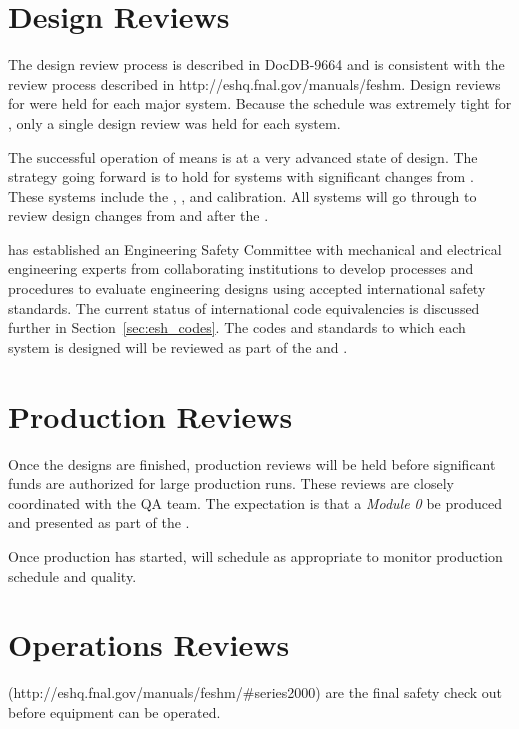 \section{Design Reviews}

The  design review process is described in DocDB-9664 and
is consistent with the \fnal review process described in
http://eshq.fnal.gov/manuals/feshm. Design reviews for
 were held for each major system. Because the
schedule was extremely tight for , only a single
design review was held for each system.

The successful operation of  means  is at
a very advanced state of design. The strategy going forward is to
hold  for systems with significant changes from
. These systems include the , ,
 and calibration. All systems will go through  to review
design changes from  and  after the
.

 has established an Engineering Safety Committee with
mechanical and electrical engineering experts from collaborating
institutions to develop processes and procedures to evaluate
engineering designs using accepted international safety standards. The
current status of international code equivalencies is discussed
further in Section~\ref{sec:esh_codes}. The codes and standards to
which each system is designed will be reviewed as part of the
 and .

\section{Production Reviews}

Once the designs are finished, production reviews will be held before
significant funds are authorized for large production runs. These
reviews are closely coordinated with the QA team. The expectation is
that a \textit{Module 0} be produced and presented as part of the
.

Once production has started,  will schedule 
as appropriate to monitor production schedule and quality.

\section{Operations Reviews}

 (http://eshq.fnal.gov/manuals/feshm/\#series2000) are the
final safety check out before equipment can be operated.

